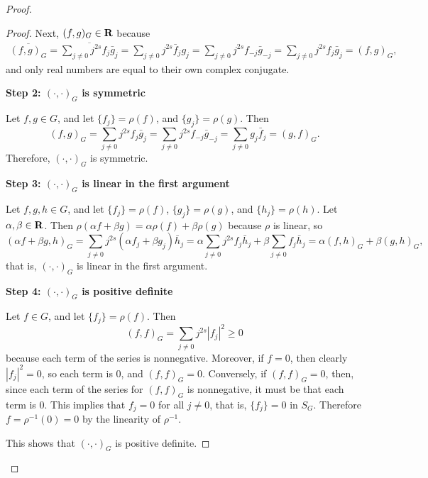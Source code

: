 \documentclass{homework}
\begin{document}
\begin{arabicparts}
\begin{proof}
\begin{proof}
			Next, $(f,g)_G \in \textbf{R}$ because
			\begin{align}
				\overline{(f,g)_G} = \overline{\sum_{j\ne0}j^{2s}f_j\bar{g}_j} = \sum_{j\ne0}j^{2s}\bar{f}_jg_j = \sum_{j\ne0}j^{2s}f_{-j}\bar{g}_{-j} = \sum_{j\ne 0}j^{2s}f_j\bar{g}_j = (f,g)_G,
			\end{align}
			and only real numbers are equal to their own complex conjugate.
			
			\textbf{Step 2: $(\cdot,\cdot)_G$ is symmetric}
			
			Let $f,g \in G$, and let $\{f_j\} = \rho(f)$, and $\{g_j\} = \rho(g)$. Then
			\begin{equation}
				(f,g)_G = \sum_{j\ne0}j^{2s}f_j\bar{g}_j = \sum_{j\ne0}j^{2s}f_{-j}\bar{g}_{-j} = \sum_{j\ne0}g_j\bar{f}_j = (g,f)_G.
			\end{equation}
			Therefore, $(\cdot,\cdot)_G$ is symmetric.
			
			\textbf{Step 3: $(\cdot,\cdot)_G$ is linear in the first argument}
			
			Let $f,g,h\in G$, and let $\{f_j\} = \rho(f)$, $\{g_j\} = \rho(g)$, and $\{h_j\} = \rho(h)$. Let $\alpha, \beta \in \textbf{R}$. Then $\rho(\alpha f + \beta g) = \alpha\rho(f) + \beta\rho(g)$ because $\rho$ is linear, so
			\begin{equation}
				(\alpha f + \beta g, h)_G = \sum_{j\ne0}j^{2s}(\alpha f_j + \beta g_j)\bar{h}_j = \alpha\sum_{j\ne0}j^{2s}f_j\bar{h}_j + \beta \sum_{j\ne0}f_j\bar{h}_j = \alpha(f,h)_G + \beta(g,h)_G,
			\end{equation}
			that is, $(\cdot,\cdot)_G$ is linear in the first argument.
			
			\textbf{Step 4: $(\cdot,\cdot)_G$ is positive definite}
			
			Let $f \in G$, and let $\{f_j\} = \rho(f)$. Then
			\begin{equation}
				(f,f)_G = \sum_{j\ne 0} j^{2s}|f_j|^2 \ge 0
			\end{equation}
			because each term of the series is nonnegative. Moreover, if $f = 0$, then clearly $|f_j|^2=0$, so each term is 0, and $(f,f)_G = 0$. Conversely, if $(f,f)_G = 0$, then, since each term of the series for $(f,f)_G$ is nonnegative, it must be that each term is 0. This implies that $f_j = 0$ for all $j\ne 0$, that is, $\{f_j\} = 0$ in $S_G$. Therefore $f = \rho^{-1}(0) = 0$ by the linearity of $\rho^{-1}$.
			
			This shows that $(\cdot,\cdot)_G$ is positive definite.
		\end{proof}
		

\end{proof}
\end{arabicparts}
\end{document}

